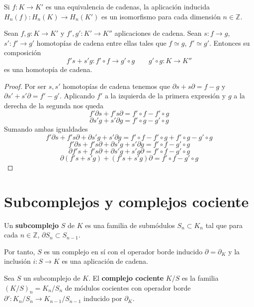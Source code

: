 \begin{corolario}
	Si $f: K \rightarrow K'$ es una equivalencia de cadenas, la aplicación inducida $H_n(f): H_n(K) \rightarrow H_n(K')$ es un isomorfismo para cada dimensión $n \in \mathbb{Z}$.
\end{corolario}

\begin{proposicion}
	Sean $f,g: K \rightarrow K'$ y $f',g': K' \rightarrow K''$ aplicaciones de cadena. Sean $s: f \rightarrow g$, $s': f' \rightarrow g'$ homotopías de cadena entre ellas tales que $f \simeq g$, $f' \simeq g'$. Entonces su composición
	\[ f' s + s' g: f' \circ f \rightarrow g' \circ g \qquad g' \circ g : K \rightarrow K'' \]
	es una homotopía de cadena.
\end{proposicion}
\begin{proof}
	Por ser $s,s'$ homotopías de cadena tenemos que $\partial s + s\partial = f-g$ y $\partial s' + s'\partial = f'-g'$. Aplicando  $f'$ a la izquierda de la primera expresión y $g$ a la derecha de la segunda nos queda
	\[ f'\partial s + f's\partial = f' \circ f-f' \circ g \]
	\[ \partial s' g + s'\partial g = f' \circ g-g' \circ g \]
	Sumando ambas igualdades
	\[ f'\partial s + f's\partial + \partial s' g + s'\partial g = f' \circ f-f' \circ g + f' \circ g-g' \circ g \]
	\[ f'\partial s + f's\partial + \partial s' g + s'\partial g = f' \circ f - g' \circ g \]
	\[ \partial f' s + f's \partial + \partial s' g + s' g \partial = f' \circ f - g' \circ g \]
	\[ \partial (f' s + s' g) + (f's + s' g) \partial = f' \circ f - g' \circ g \]
\end{proof}

\section{Subcomplejos y complejos cociente}

\begin{definicion}
	Un \textbf{subcomplejo} $S$ de $K$ es una familia de submódulos $S_n \subset K_n$ tal que para cada $n \in \mathbb{Z}$, $\partial S_n \subset S_{n-1}$.
\end{definicion}

Por tanto, $S$ es un complejo en sí con el operador borde inducido $\partial = \partial_K$ y la inclusión $i: S \rightarrow K$ es una aplicación de cadena.

\begin{definicion}
	Sea $S$ un subcomplejo de $K$. El \textbf{complejo cociente} $K/S$ es la familia $(K/S)_n = K_n/S_n$ de módulos cocientes con operador borde $\partial': K_n/S_n \rightarrow K_{n-1}/S_{n-1}$ inducido por $\partial_K$.
\end{definicion}

